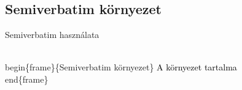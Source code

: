\documentclass[aspectratio=169,12pt,xcolor={table}]{beamer}
\begin{document}
\subsection{Semiverbatim környezet}
\begin{frame}[fragile]{Semiverbatim használata}
\begin{semiverbatim}
\transboxin
\color{blue}\\begin\{frame\}\alert{\{Semiverbatim környezet\}}
\textcolor{black}{A környezet tartalma}
\\end\{frame\}
\end{semiverbatim}
\end{frame}
\end{document}
